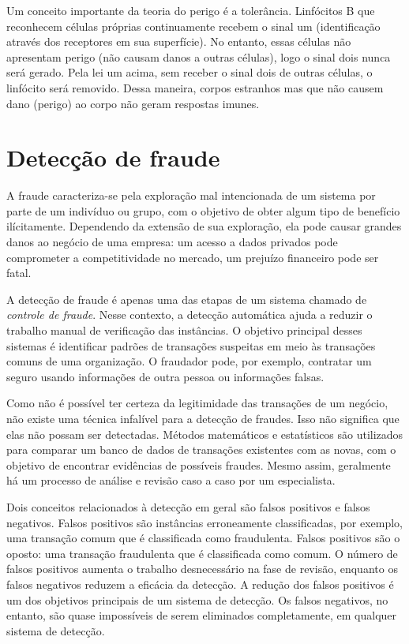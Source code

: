 \documentclass{iiufrgs}
\begin{document}
Um conceito importante da teoria do perigo é a tolerância. Linfócitos B que reconhecem células próprias continuamente recebem o sinal um (identificação através dos receptores em sua superfície). No entanto, essas células não apresentam perigo (não causam danos a outras células), logo o sinal dois nunca será gerado. Pela lei um acima, sem receber o sinal dois de outras células, o linfócito será removido. Dessa maneira, corpos estranhos mas que não causem dano (perigo) ao corpo não geram respostas imunes.

\chapter{Detecção de fraude}

A fraude caracteriza-se pela exploração mal intencionada de um sistema por parte de um indivíduo ou grupo, com o objetivo de obter algum tipo de benefício ilícitamente. Dependendo da extensão de sua exploração, ela pode causar grandes danos ao negócio de uma empresa: um acesso a dados privados pode comprometer a competitividade no mercado, um prejuízo financeiro pode ser fatal.

A detecção de fraude é apenas uma das etapas de um sistema chamado de \emph{controle de fraude}. Nesse contexto, a detecção automática ajuda a reduzir o trabalho manual de verificação das instâncias. O objetivo principal desses sistemas é identificar padrões de transações suspeitas em meio às transações comuns de uma organização. O fraudador pode, por exemplo, contratar um seguro usando informações de outra pessoa ou informações falsas.

Como não é possível ter certeza da legitimidade das transações de um negócio, não existe uma técnica infalível para a detecção de fraudes. Isso não significa que elas não possam ser detectadas. Métodos matemáticos e estatísticos são utilizados para comparar um banco de dados de transações existentes com as novas, com o objetivo de encontrar evidências de possíveis fraudes. Mesmo assim, geralmente há um processo de análise e revisão caso a caso por um especialista.

Dois conceitos relacionados à detecção em geral são falsos positivos e falsos negativos. Falsos positivos são instâncias erroneamente classificadas, por exemplo, uma transação comum que é classificada como fraudulenta. Falsos positivos são o oposto: uma transação fraudulenta que é classificada como comum. O número de falsos positivos aumenta o trabalho desnecessário na fase de revisão, enquanto os falsos negativos reduzem a eficácia da detecção. A redução dos falsos positivos é um dos objetivos principais de um sistema de detecção. Os falsos negativos, no entanto, são quase impossíveis de serem eliminados completamente, em qualquer sistema de detecção.
\end{document}
